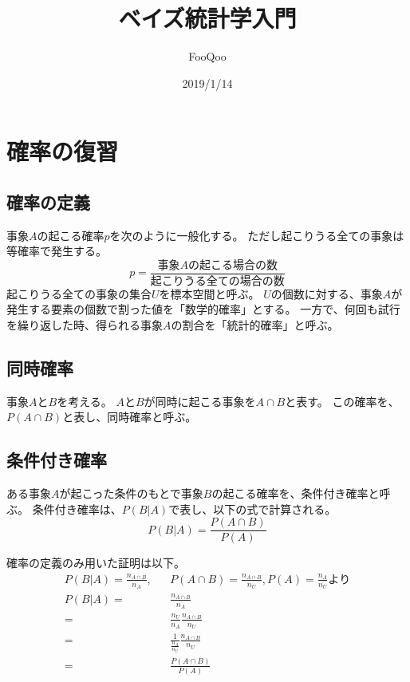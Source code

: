 \documentclass{ltjsarticle}
\title{ベイズ統計学入門}
\author{FooQoo}
\begin{document}
\date{2019/1/14}
\maketitle
\section{確率の復習}
\subsection{確率の定義}
事象$A$の起こる確率$p$を次のように一般化する。
ただし起こりうる全ての事象は等確率で発生する。
\begin{equation}
    p=\frac{事象Aの起こる場合の数}{起こりうる全ての場合の数}
\end{equation}
起こりうる全ての事象の集合$U$を標本空間と呼ぶ。
$U$の個数に対する、事象$A$が発生する要素の個数で割った値を「数学的確率」とする。
一方で、何回も試行を繰り返した時、得られる事象$A$の割合を「統計的確率」と呼ぶ。

\subsection{同時確率}
事象$A$と$B$を考える。
$A$と$B$が同時に起こる事象を$A \cap B$と表す。
この確率を、$P(A \cap B)$と表し、同時確率と呼ぶ。

\subsection{条件付き確率}
ある事象$A$が起こった条件のもとで事象$B$の起こる確率を、条件付き確率と呼ぶ。
条件付き確率は、$P(B|A)$で表し、以下の式で計算される。
\begin{equation}
    P(B|A)=\frac{P(A \cap B)}{P(A)}
\end{equation}

確率の定義のみ用いた証明は以下。
\begin{eqnarray}
    P(B|A)=\frac{n_{A \cap B}}{n_A}, & & P(A \cap B)=\frac{n_{A \cap B}}{n_U}, P(A)=\frac{n_A}{n_U}より \nonumber \\
    P(B|A)=& &\frac{n_{A \cap B}}{n_A} \\
    =& &\frac{n_U}{n_A} \frac{n_{A \cap B}}{n_U} \\
    =& &\frac{1}{\frac{n_A}{n_U}}\frac{n_{A \cap B}}{n_U} \\
    =& &\frac{P(A \cap B)}{P(A)}
\end{eqnarray}
\end{document}
